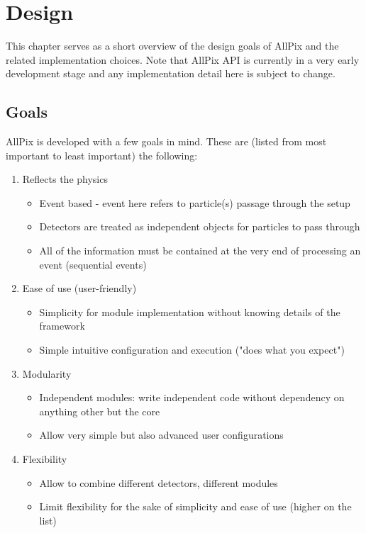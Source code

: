 \section{Design}
This chapter serves as a short overview of the design goals of AllPix and the related implementation choices. Note that AllPix API is currently in a very early development stage and any implementation detail here is subject to change.

\subsection{Goals}
AllPix is developed with a few goals in mind. These are (listed from most important to least important) the following:
\begin{enumerate}
    \item Reflects the physics
    \begin{itemize}
        \item Event based - event here refers to particle(s) passage through the setup
        \item Detectors are treated as independent objects for particles to pass through
        \item All of the information must be contained at the very end of processing an event (sequential events)
    \end{itemize}
    \item Ease of use (user-friendly)
    \begin{itemize}
        \item Simplicity for module implementation without knowing details of the framework
        \item Simple intuitive configuration and execution ("does what you expect")
    \end{itemize}
    \item Modularity
    \begin{itemize}
        \item Independent modules: write independent code without dependency on anything other but the core
        \item Allow very simple but also advanced user configurations
    \end{itemize}
    \item Flexibility
    \begin{itemize}
        \item Allow to combine different detectors, different modules
        \item Limit flexibility for the sake of simplicity and ease of use (higher on the list)
    \end{itemize}
\end{enumerate}

